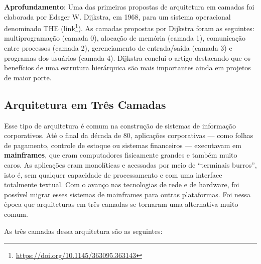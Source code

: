 \documentclass[
  11pt,
  twoside]{book}
\DeclareRobustCommand{\href}[2]{#2\footnote{\url{#1}}}
\newenvironment{esmbox}{\centering \vspace{1.5ex} \begin{tcolorbox}[breakable, colback=backcolor, width=4.9in]}{\end{tcolorbox} \vspace{1.5ex}}
\begin{document}
 

\begin{esmbox}

\textbf{Aprofundamento}: Uma das primeiras propostas de arquitetura em
camadas foi elaborada por Edsger W. Dijkstra, em 1968, para um sistema
operacional denominado THE
(\href{https://doi.org/10.1145/363095.363143}{link}). As camadas
propostas por Dijkstra foram as seguintes: multiprogramação (camada 0),
alocação de memória (camada 1), comunicação entre processos (camada 2),
gerenciamento de entrada/saída (camada 3) e programas dos usuários
(camada 4). Dijkstra conclui o artigo destacando que os benefícios de
uma estrutura hierárquica são mais importantes ainda em projetos de
maior porte.

\end{esmbox}

\hypertarget{arquitetura-em-truxeas-camadas}{%
\subsection{Arquitetura em Três
Camadas}\label{arquitetura-em-truxeas-camadas}}


 Esse tipo de arquitetura é comum na construção de
sistemas de informação corporativos. Até o final da década de 80,
aplicações corporativas --- como folhas de pagamento, controle de
estoque ou sistemas financeiros --- executavam em \textbf{mainframes},
que eram computadores fisicamente grandes e também muito caros. As
aplicações eram monolíticas e acessadas por meio de ``terminais
burros'', isto é, sem qualquer capacidade de processamento e com uma
interface totalmente textual. Com o avanço nas tecnologias de rede e de
hardware, foi possível migrar esses sistemas de mainframes para outras
plataformas. Foi nessa época que arquiteturas em três camadas se
tornaram uma alternativa muito comum.

As três camadas dessa arquitetura são as seguintes:
\end{document}
